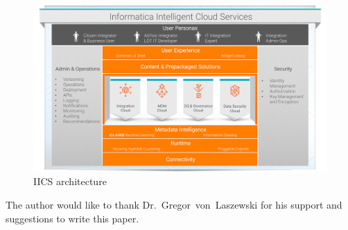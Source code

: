 \begin{figure}[!ht]
	\centering\includegraphics[width=\columnwidth]{images/iics-diagram.png} \caption{IICS
	architecture}\label{f:iics-products}
\end{figure}

\begin{acks}

The author would like to thank Dr.~Gregor~von~Laszewski for his
support and suggestions to write this paper.

\end{acks}


 
